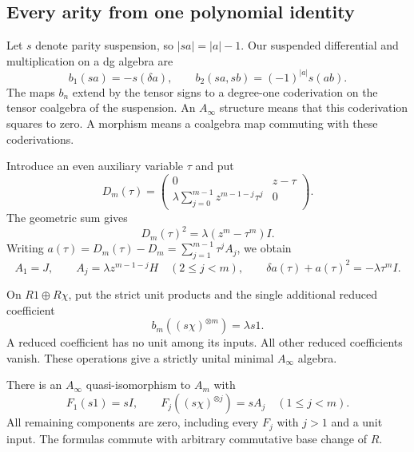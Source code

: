 \subsection{Every arity from one polynomial identity}

Let $s$ denote parity suspension, so $|sa|=|a|-1$.
Our suspended differential and multiplication on a dg
algebra are
\begin{equation}\label{mc:rmf:eq:bar-signs}
 b_1(sa)=-s(\delta a),\qquad
 b_2(sa,sb)=(-1)^{|a|}s(ab).
\end{equation}
The maps $b_n$ extend by the tensor signs to a degree-one
coderivation on the tensor coalgebra of the suspension.
An $A_\infty$ structure means that this coderivation
squares to zero. A morphism means a coalgebra map
commuting with these coderivations.

Introduce an even auxiliary variable $\tau$ and put
\begin{equation}\label{mc:rmf:eq:translated}
 D_m(\tau)=
 \begin{pmatrix}
  0&z-\tau\\
  \displaystyle\lambda\sum_{j=0}^{m-1}z^{m-1-j}\tau^j&0
 \end{pmatrix}.
\end{equation}
The geometric sum gives
\[
 D_m(\tau)^2=\lambda(z^m-\tau^m)I.
\]
Writing $a(\tau)=D_m(\tau)-D_m=\sum_{j=1}^{m-1}\tau^jA_j$,
we obtain
\begin{equation}\label{mc:rmf:eq:Taylor}
 A_1=J,\qquad A_j=\lambda z^{m-1-j}H\quad(2\le j<m),
 \qquad \delta a(\tau)+a(\tau)^2=-\lambda \tau^mI.
\end{equation}

\begin{theorem}\label{mc:rmf:thm:minimal}
On $R1\oplus R\chi$, put the strict unit products and
the single additional reduced coefficient
\begin{equation}\label{mc:rmf:eq:higher}
 b_m((s\chi)^{\otimes m})=\lambda s1.
\end{equation}
A reduced coefficient has no unit among its inputs.
All other reduced coefficients vanish. These operations
give a strictly unital minimal $A_\infty$ algebra.

There is an $A_\infty$ quasi-isomorphism to $A_m$ with
\begin{equation}\label{mc:rmf:eq:comparison}
 F_1(s1)=sI,\qquad
 F_j((s\chi)^{\otimes j})=sA_j\quad(1\le j<m).
\end{equation}
All remaining components are zero, including every
$F_j$ with $j>1$ and a unit input.
The formulas commute with arbitrary commutative
base change of $R$.
\end{theorem}

